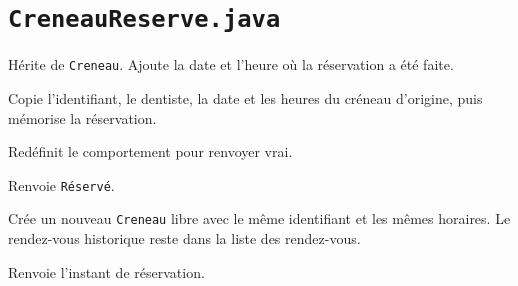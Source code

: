 \documentclass[11pt,a4paper]{report}
\begin{document}
\section{\texttt{CreneauReserve.java}}
Hérite de \texttt{Creneau}. Ajoute la date et l'heure où la réservation a été faite.
\begin{description}[leftmargin=3.5cm,style=nextline]
\item[\texttt{CreneauReserve(creneau, dateReservation)}] Copie l'identifiant, le dentiste, la date et les heures du créneau d'origine, puis mémorise la réservation.
\item[\texttt{estReserve()}] Redéfinit le comportement pour renvoyer vrai.
\item[\texttt{getEtat()}] Renvoie \texttt{Réservé}.
\item[\texttt{liberer()}] Crée un nouveau \texttt{Creneau} libre avec le même identifiant et les mêmes horaires. Le rendez-vous historique reste dans la liste des rendez-vous.
\item[\texttt{getDateReservation()}] Renvoie l'instant de réservation.
\end{description}
\end{document}
